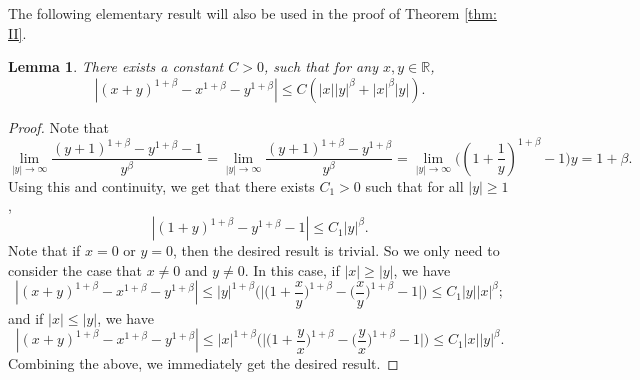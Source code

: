 \documentclass[12pt,a4paper]{amsart}
\theoremstyle{plain}
\newtheorem{lem}[thm]{Lemma}
\theoremstyle{definition}
\numberwithin{equation}{section}
\begin{document}
The following elementary result will also be used in the proof of Theorem \ref{thm: II}.
\begin{lem}\label{ineq: analysis}
There exists a constant $C>0$, such that for any $x,y \in \mathbb R$,
\[
    |(x+y)^{1+\beta}-x^{1+\beta}-y^{1+\beta}|\leq C(|x||y|^{\beta}+|x|^{\beta}|y|).
\]
\end{lem}
\begin{proof}
   Note that
\[
  \lim_{|y|\rightarrow \infty}\frac{(y+1)^{1+\beta}-y^{1+\beta}-1}{y^{\beta}}=\lim_{|y|\rightarrow \infty}\frac{(y+1)^{1+\beta}-y^{1+\beta}}{y^{\beta}}=\lim_{|y|\rightarrow \infty}\big((1+\frac{1}{y})^{1+\beta}-1\big)y = 1+\beta.
\]
Using this and continuity, we get that there exists $C_1>0$ such that for all $|y|\geq 1$,
\[
  |(1+y)^{1+\beta}-y^{1+\beta}-1|\leq C_1 |y|^{\beta}.
\]
 Note that if $x = 0$ or $y= 0$, then the desired result is trivial.
So we only need to consider
 the case that $x \neq 0$ and $y \neq 0$.
 In this case, if $|x|\geq |y|$, we have
\[
|(x+y)^{1+\beta}-x^{1+\beta}-y^{1+\beta}|\leq |y|^{1+\beta}\bigg(\Big|\Big(1+\frac{x}{y}\Big)^{1+\beta}-\Big(\frac{x}{y}\Big)^{1+\beta}-1\Big|\bigg)\leq C_1|y||x|^{\beta};
\]
and  if $|x|\leq |y|$, we have
\[
	|(x+y)^{1+\beta}-x^{1+\beta}-y^{1+\beta}|
	\leq |x|^{1+\beta}\bigg( \Big| \Big(1+\frac{y}{x}\Big)^{1+\beta}-\Big(\frac{y}{x}\Big)^{1+\beta}-1\Big|\bigg)\leq C_1|x||y|^{\beta}.
\]
Combining the above, we immediately get the desired result.
\end{proof}
\end{document}
